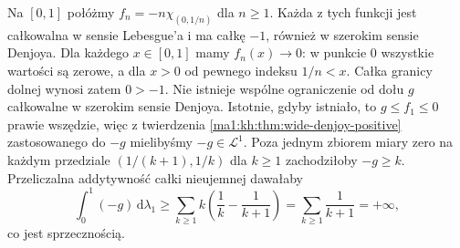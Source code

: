 \begin{przyklad}
Na $[0,1]$ połóżmy $f_n=-n\chi_{(0,1/n)}$ dla $n\ge1$.
Każda z tych funkcji jest całkowalna w sensie Lebesgue'a
i ma całkę $-1$, również w szerokim sensie Denjoya.
Dla każdego $x\in[0,1]$ mamy $f_n(x)\to0$: w punkcie
$0$ wszystkie wartości są zerowe, a dla $x>0$ od
pewnego indeksu $1/n<x$. Całka granicy dolnej wynosi
zatem $0>-1$.
Nie istnieje wspólne ograniczenie od dołu $g$ całkowalne
w szerokim sensie Denjoya. Istotnie, gdyby istniało,
to $g\le f_1\le0$ prawie wszędzie, więc z twierdzenia
\ref{ma1:kh:thm:wide-denjoy-positive} zastosowanego do
$-g$ mielibyśmy $-g\in\mathcal L^1$.
Poza jednym zbiorem miary zero na każdym przedziale
$(1/(k+1),1/k)$ dla $k\ge1$ zachodziłoby $-g\ge k$.
Przeliczalna addytywność całki nieujemnej dawałaby
\[
 \int_0^1(-g)\,\mathrm d\lambda_1
 \ge \sum_{k\ge1} k\left(\frac1k-\frac1{k+1}\right)
 =\sum_{k\ge1}\frac1{k+1}=+\infty,
\]
co jest sprzecznością.
\end{przyklad}

